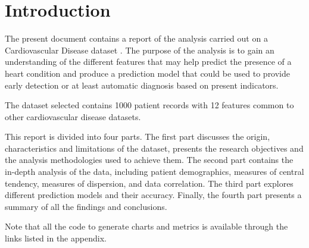 \section{Introduction}
The present document contains a report of the analysis carried out on a Cardiovascular Disease dataset
\cite{Dataset}. The purpose of the analysis is to gain an understanding of the
different features that may help predict the presence of a heart condition and produce a prediction model
that could be used to provide early detection or at least automatic diagnosis based on present indicators.

The dataset selected contains 1000 patient records with 12 features common to other cardiovascular disease datasets.

This report is divided into four parts. The first part discusses the origin, characteristics and limitations of the dataset,
presents the research objectives and the analysis methodologies used to achieve them. The second part contains the in-depth
analysis of the data, including patient demographics, measures of central tendency, measures of dispersion, and data correlation.
The third part explores different prediction models and their accuracy. Finally, the fourth part presents a summary of all the
findings and conclusions.

Note that all the code to generate charts and metrics is available through the links listed in the appendix.
